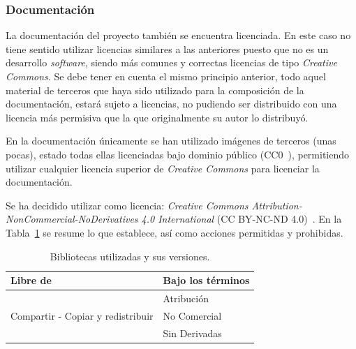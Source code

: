 
\subsubsection{Documentación}
La documentación del proyecto también se encuentra licenciada. En este caso no tiene sentido utilizar licencias similares a las anteriores puesto que no es un desarrollo \textit{software}, siendo más comunes y correctas licencias de tipo \textit{Creative Commons}. Se debe tener en cuenta el mismo principio anterior, todo aquel material de terceros que haya sido utilizado para la composición de la documentación, estará sujeto a licencias, no pudiendo ser distribuido con una licencia más permisiva que la que originalmente su autor lo distribuyó. 

En la documentación únicamente se han utilizado imágenes de terceros (unas pocas), estado todas ellas licenciadas bajo dominio público (CC0~\cite{CC0}), permitiendo utilizar cualquier licencia superior de \textit{Creative Commons} para licenciar la documentación.

Se ha decidido utilizar como licencia: \textit{Creative Commons Attribution-NonCommercial-NoDerivatives 4.0 International} (CC BY-NC-ND 4.0)~\cite{CCBYNCND40}.  En la Tabla~\ref{tab:licencia-documentacion} se resume lo que establece, así como acciones permitidas y prohibidas.

\begin{table}[H]
\centering
\begin{tabular}{ll}
\toprule
	\textbf{Libre de} & \textbf{Bajo los términos}\\
	\midrule
	\multirow{3}{*}{Compartir - Copiar y redistribuir}   &Atribución\\
	    & No Comercial   \\  
	   & Sin Derivadas  \\ 
	\bottomrule
\end{tabular}
\caption{Bibliotecas utilizadas y sus versiones.}\label{tab:licencia-documentacion}
\end{table}
